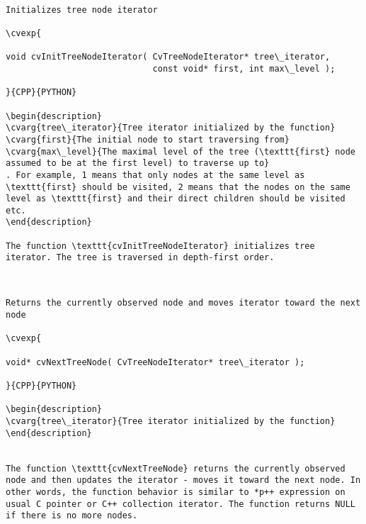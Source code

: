 \begin{verbatim}

Initializes tree node iterator

\cvexp{

void cvInitTreeNodeIterator( CvTreeNodeIterator* tree\_iterator,
                             const void* first, int max\_level );

}{CPP}{PYTHON}

\begin{description}
\cvarg{tree\_iterator}{Tree iterator initialized by the function}
\cvarg{first}{The initial node to start traversing from}
\cvarg{max\_level}{The maximal level of the tree (\texttt{first} node assumed to be at the first level) to traverse up to}
. For example, 1 means that only nodes at the same level as \texttt{first} should be visited, 2 means that the nodes on the same level as \texttt{first} and their direct children should be visited etc.
\end{description}

The function \texttt{cvInitTreeNodeIterator} initializes tree iterator. The tree is traversed in depth-first order.


\end{verbatim}
\begin{verbatim}

Returns the currently observed node and moves iterator toward the next node

\cvexp{

void* cvNextTreeNode( CvTreeNodeIterator* tree\_iterator );

}{CPP}{PYTHON}

\begin{description}
\cvarg{tree\_iterator}{Tree iterator initialized by the function}
\end{description}


The function \texttt{cvNextTreeNode} returns the currently observed node and then updates the iterator - moves it toward the next node. In other words, the function behavior is similar to *p++ expression on usual C pointer or C++ collection iterator. The function returns NULL if there is no more nodes.


\end{verbatim}
